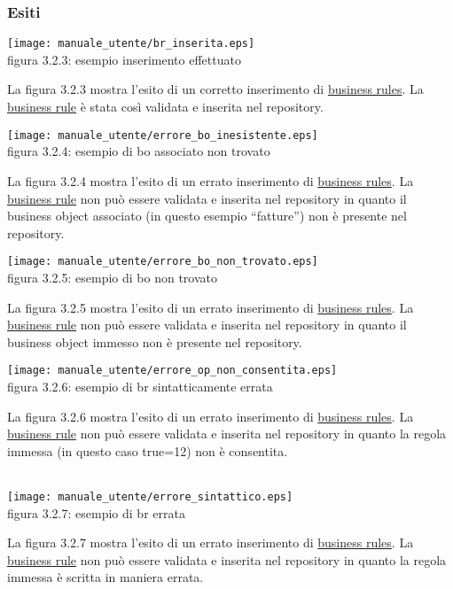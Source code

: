 \subsubsection{Esiti}
\begin{center}
\texttt{[image: manuale\_utente/br\_inserita.eps]}\\
 figura 3.2.3: esempio inserimento effettuato
\end{center} 
La figura 3.2.3 mostra l'esito di un corretto inserimento di \underline{business rules}. La \underline{business rule} \`e stata cos\`i validata e inserita nel repository.

\begin{center}
\texttt{[image: manuale\_utente/errore\_bo\_inesistente.eps]}\\
 figura 3.2.4: esempio di bo associato non trovato
\end{center} 
La figura 3.2.4 mostra l'esito di un errato inserimento di \underline{business rules}. La \underline{business rule} non pu\`o essere validata e inserita nel repository in quanto il business object associato (in questo esempio ``fatture'') non \`e presente nel repository.

\begin{center}
\texttt{[image: manuale\_utente/errore\_bo\_non\_trovato.eps]}\\
 figura 3.2.5: esempio di bo non trovato
\end{center} 
La figura 3.2.5 mostra l'esito di un errato inserimento di \underline{business rules}. La \underline{business rule} non pu\`o essere validata e inserita nel repository in quanto il business object immesso non \`e presente nel repository.

\begin{center}
\texttt{[image: manuale\_utente/errore\_op\_non\_consentita.eps]}\\
 figura 3.2.6: esempio di br sintatticamente errata 
\end{center} 
La figura 3.2.6 mostra l'esito di un errato inserimento di \underline{business rules}. La \underline{business rule} non pu\`o essere validata e inserita nel repository in quanto la regola immessa (in questo caso true=12) non \`e consentita.
\\
\\
\begin{center}
\texttt{[image: manuale\_utente/errore\_sintattico.eps]}\\
 figura 3.2.7: esempio di br errata
\end{center} 
La figura 3.2.7 mostra l'esito di un errato inserimento di \underline{business rules}. La \underline{business rule} non pu\`o essere validata e inserita nel repository in quanto la regola immessa \`e scritta in maniera errata.

